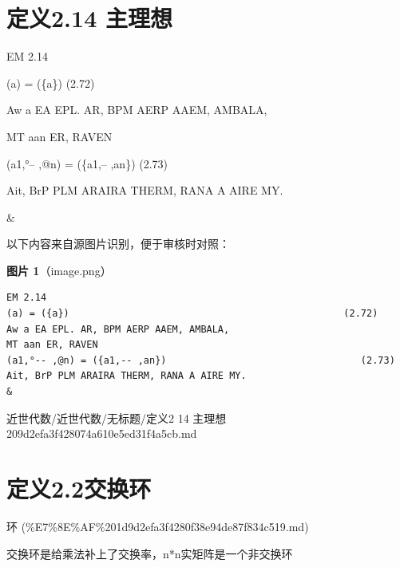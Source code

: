 \section*{定义2.14 主理想}

\begin{definition}[定义2.14 主理想]

EM 2.14

(a) = (\{a\})                                                (2.72)

Aw a EA EPL. AR, BPM AERP AAEM, AMBALA,

MT aan ER, RAVEN

(a1,°-- ,@n) = (\{a1,-- ,an\})                                  (2.73)

Ait, BrP PLM ARAIRA THERM, RANA A AIRE MY.

\&

\end{definition}

\begin{note}
以下内容来自源图片识别，便于审核时对照：

\textbf{图片 1}（image.png）
\begin{Verbatim}[fontsize=\small]
EM 2.14
(a) = ({a})                                                (2.72)
Aw a EA EPL. AR, BPM AERP AAEM, AMBALA,
MT aan ER, RAVEN
(a1,°-- ,@n) = ({a1,-- ,an})                                  (2.73)
Ait, BrP PLM ARAIRA THERM, RANA A AIRE MY.
&
\end{Verbatim}

\end{note}

\begin{note}[来源路径]

近世代数/近世代数/无标题/定义2 14 主理想 209d2efa3f428074a610e5ed31f4a5cb.md

\end{note}

\section*{定义2.2交换环}

\begin{note}[来源上级主题]

环 (\%E7\%8E\%AF\%201d9d2efa3f4280f38e94de87f834c519.md)

\end{note}

\begin{definition}[定义2.2交换环]

交换环是给乘法补上了交换率，n*n实矩阵是一个非交换环

\end{definition}

